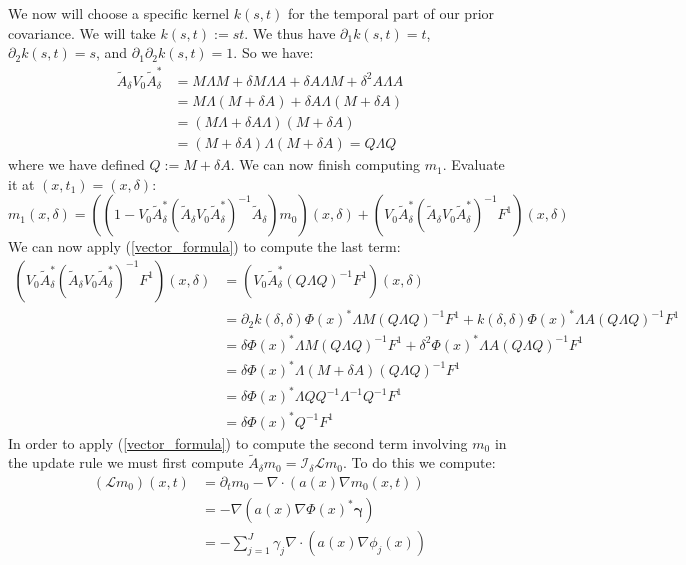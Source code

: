 \documentclass{article}
\theoremstyle{definition}
\theoremstyle{remark}
\theoremstyle{remark}
\begin{document}
We now will choose a specific kernel $k(s,t)$ for the temporal part of our prior covariance. We will take $k(s,t):=st$. We thus have $\partial_{1}k(s,t)=t$, $\partial_{2}k(s,t)=s$, and $\partial_{1}\partial_{2}k(s,t)=1$. So we have:
\begin{align*}
    \tilde{A}_{\delta}V_{0}\tilde{A}_{\delta}^{*} &= M\Lambda M + \delta M\Lambda A + \delta A\Lambda M +  \delta^{2}A\Lambda A \\
    &= M\Lambda(M+\delta A)+\delta A \Lambda(M+\delta A) \\
    &= (M\Lambda+\delta A \Lambda)(M+\delta A) \\
    &= (M+\delta A)\Lambda(M+\delta A) = Q\Lambda Q
\end{align*}
where we have defined $Q:=M+\delta A$. We can now finish computing $m_{1}$. Evaluate it at $(x,t_{1})=(x,\delta)$:
\begin{equation*}
    m_{1}(x,\delta)=((1-V_{0}\tilde{A}_{\delta}^{*}(\tilde{A}_{\delta}V_{0}\tilde{A}_{\delta}^{*})^{-1}\tilde{A}_{\delta})m_{0})(x,\delta)+(V_{0}\tilde{A}_{\delta}^{*}(\tilde{A}_{\delta}V_{0}\tilde{A}_{\delta}^{*})^{-1}F^{1})(x,\delta)
\end{equation*}
We can now apply (\ref{vector_formula}) to compute the last term:
\begin{align*}
    (V_{0}\tilde{A}_{\delta}^{*}(\tilde{A}_{\delta}V_{0}\tilde{A}_{\delta}^{*})^{-1}F^{1})(x,\delta) &= (V_{0}\tilde{A}_{\delta}^{*}(Q\Lambda Q)^{-1}F^{1})(x,\delta) \\
    &=\partial_{2}k(\delta,\delta)\Phi(x)^{*}\Lambda M (Q\Lambda Q)^{-1}F^{1}+k(\delta,\delta)\Phi(x)^{*}\Lambda A (Q\Lambda Q)^{-1}F^{1} \\
    &= \delta\Phi(x)^{*}\Lambda M(Q\Lambda Q)^{-1}F^{1}+\delta^{2}\Phi(x)^{*}\Lambda A (Q\Lambda Q)^{-1}F^{1} \\
    &=\delta\Phi(x)^{*}\Lambda(M+\delta A)(Q\Lambda Q)^{-1}F^{1} \\
    &=\delta\Phi(x)^{*}\Lambda Q Q^{-1}\Lambda^{-1} Q^{-1}F^{1} \\
    &=\delta\Phi(x)^{*}Q^{-1}F^{1}
\end{align*}
In order to apply (\ref{vector_formula}) to compute the second term involving $m_{0}$ in the update rule we must first compute $\tilde{A}_{\delta}m_{0}=\mathcal{I}_{\delta}\mathcal{L}m_{0}$. To do this we compute:
\begin{align*}
    (\mathcal{L}m_{0})(x,t)&=\partial_{t}m_{0}-\nabla\cdot(a(x)\nabla m_{0}(x,t)) \\
    &=-\nabla(a(x)\nabla\Phi(x)^{*}\boldsymbol{\gamma}) \\
    &=-\sum_{j=1}^{J}\gamma_{j}\nabla\cdot(a(x)\nabla\phi_{j}(x))
\end{align*}
\end{document}
